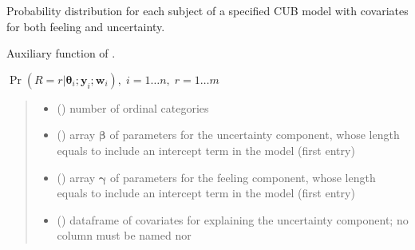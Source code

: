 \documentclass[letterpaper,10pt,english]{sphinxmanual}
\begin{document}

\begin{fulllineitems}
\label{\detokenize{cubmods:cubmods.cub_yw.pmfi}}
\pysigstartsignatures
{}
\pysigstopsignatures
\sphinxAtStartPar
Probability distribution for each subject of a specified CUB model 
with covariates for both feeling and uncertainty.

\sphinxAtStartPar
Auxiliary function of .

\sphinxAtStartPar
\(\Pr(R = r | \pmb\theta_i ; \pmb y_i; \pmb w_i),\; i=1 \ldots n ,\; r=1 \ldots m\)
\begin{quote}\begin{description}
\begin{itemize}
\item {} 
\sphinxAtStartPar
{} () \textendash{} number of ordinal categories

\item {} 
\sphinxAtStartPar
{} () \textendash{} array \(\pmb \beta\) of parameters for the uncertainty component, whose length equals 
 to include an intercept term in the model (first entry)

\item {} 
\sphinxAtStartPar
{} () \textendash{} array \(\pmb \gamma\) of parameters for the feeling component, whose length equals 
 to include an intercept term in the model (first entry)

\item {} 
\sphinxAtStartPar
{} () \textendash{} dataframe of covariates for explaining the uncertainty component;
no column must be named  nor 


\end{itemize}
\end{description}
\end{quote}
\end{fulllineitems}
\end{document}

